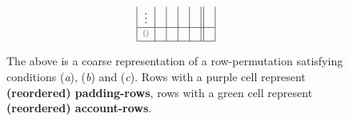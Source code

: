 \begin{figure}[h!]
\[\begin{array}{|c|c|c|c|c||c|}
			\vdots               &                          &                         &                   &                   &                            \\ \hline
			\gZero               &                          &                         &                   &                   &                            \\ \hline
		\end{array}
	\]
	\caption{The above is a coarse representation of a row-permutation satisfying conditions
	(\emph{a}),
	(\emph{b}) and
	(\emph{c}).
	Rows with a purple cell represent \textbf{(reordered) padding-rows}, rows with a green cell represent \textbf{(reordered) account-rows}.
	}\label{hub: consistency: account: graphical representation of permutation}
\end{figure}

